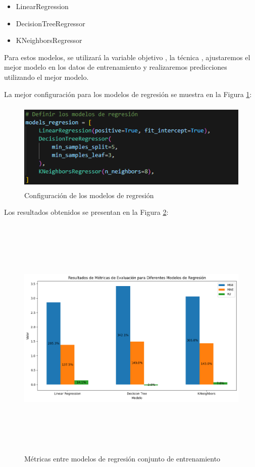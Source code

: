 \begin{itemize}
    \item LinearRegression
    \item DecisionTreeRegressor
    \item KNeighborsRegressor
\end{itemize}

Para estos modelos, se utilizará la variable objetivo , la técnica , ajustaremos el mejor modelo en los datos de entrenamiento y realizaremos predicciones utilizando el mejor modelo.

La mejor configuración para los modelos de regresión se muestra en la Figura \ref{fig:config_regresion}:

\begin{figure}[H]
    \centering
    \includegraphics[width=5.06111in,height=1.68611in]{img/compara_algoritmos/configModelsRegresion.png}
    \caption{Configuración de los modelos de regresión}
    \label{fig:config_regresion}
\end{figure}

Los resultados obtenidos se presentan en la Figura \ref{fig:metricas_regresion}:

\begin{figure}[H]
    \centering
    \includegraphics[width=7.06111in,height=4.68611in]{img/compara_algoritmos/metricasEntreModelosRegresion.png}
    \caption{Métricas entre modelos de regresión conjunto de entrenamiento}
    \label{fig:metricas_regresion}
\end{figure}


